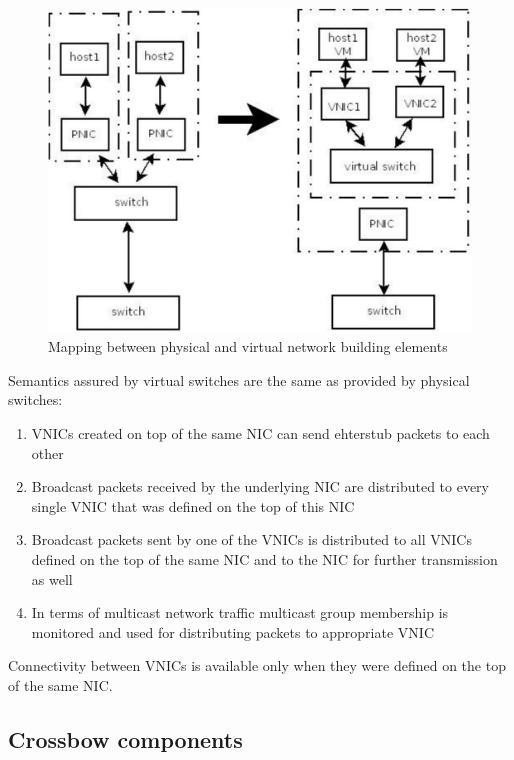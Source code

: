 \documentclass[11pt]{book}
\begin{document}
        \begin{figure}[H]
          \begin{center}
            \includegraphics[width=.7\textwidth]{img/physical_and_virtual_switches_mapping.pdf}
          \end{center}

          \caption{Mapping between physical and virtual network building elements}
        \end{figure}
        
        Semantics assured by virtual switches are the same as provided by physical switches: 

        \begin{enumerate}
          \item VNICs created on top of the same NIC can send ehterstub packets to each other
          \item Broadcast packets received by the underlying NIC are distributed to every single VNIC that was defined
                on the top of this NIC
          \item Broadcast packets sent by one of the VNICs is distributed to all VNICs defined on the top of the same
                NIC and to the NIC for further transmission as well
          \item In terms of multicast network traffic multicast group membership is monitored and used for distributing
                packets to appropriate VNIC
        \end{enumerate}

        Connectivity between VNICs is available only when they were defined on the top of the same NIC. 

	
      \subsection{Crossbow components}
\end{document}
